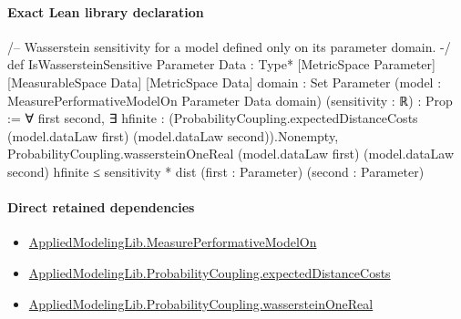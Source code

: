 \documentclass[10pt]{article}
\begin{document}
\paragraph{Exact Lean library declaration}
\begin{ReviewVerbatim}
/-- Wasserstein sensitivity for a model defined only on its parameter domain. -/
def IsWassersteinSensitive
    {Parameter Data : Type*} [MetricSpace Parameter] [MeasurableSpace Data]
    [MetricSpace Data] {domain : Set Parameter}
    (model : MeasurePerformativeModelOn Parameter Data domain)
    (sensitivity : ℝ) : Prop :=
  ∀ first second,
    ∃ hfinite : (ProbabilityCoupling.expectedDistanceCosts
      (model.dataLaw first) (model.dataLaw second)).Nonempty,
      ProbabilityCoupling.wassersteinOneReal
          (model.dataLaw first) (model.dataLaw second) hfinite ≤
        sensitivity * dist (first : Parameter) (second : Parameter)
\end{ReviewVerbatim}

\paragraph{Direct retained dependencies}
\begin{itemize}\raggedright
\item \hyperlink{library-prerequisite-e14cc5e8b1e1460e}{Applied\allowbreak{}Modeling\allowbreak{}Lib.\allowbreak{}Measure\allowbreak{}Performative\allowbreak{}Model\allowbreak{}On}
\item \hyperlink{governing-declaration-0507d24247d6815a}{Applied\allowbreak{}Modeling\allowbreak{}Lib.\allowbreak{}Probability\allowbreak{}Coupling.\allowbreak{}expected\allowbreak{}Distance\allowbreak{}Costs}
\item \hyperlink{governing-declaration-7fdf7bcf28dbe52b}{Applied\allowbreak{}Modeling\allowbreak{}Lib.\allowbreak{}Probability\allowbreak{}Coupling.\allowbreak{}wasserstein\allowbreak{}One\allowbreak{}Real}
\end{itemize}
\end{document}
